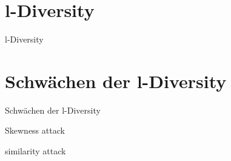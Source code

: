\section{l-Diversity}

\begin{frame}{l-Diversity}

\end{frame}

\section{Schwächen der l-Diversity}

\begin{frame}{Schwächen der l-Diversity}

Skewness attack

similarity attack

\end{frame}